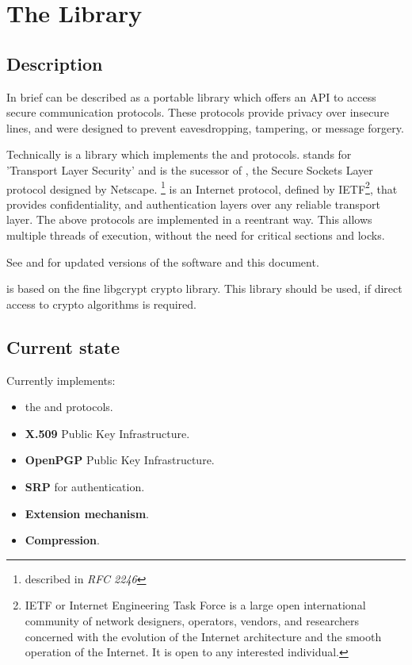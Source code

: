 \chapter{The Library}

\section{Description}
\par
In brief \gnutls{} can be described as a portable library which offers
an API to access secure communication protocols. These protocols provide
privacy over insecure lines, and were designed to prevent 
eavesdropping, tampering, or message forgery.

\par
Technically \gnutls{} is a library which implements the \tlsI{} and 
\sslIII{} protocols. \tls{} stands for 'Transport Layer Security' and is the sucessor of \ssl{}, 
the Secure Sockets Layer protocol designed by Netscape. 
\tlsI{}\footnote{described in {\it RFC 2246}} is an Internet protocol,
defined by {IETF}\footnote{IETF or Internet Engineering Task Force 
is a large open international community of network
designers, operators, vendors, and researchers concerned with the evolution of 
the Internet architecture and the smooth operation of the Internet. It is open to any interested individual.}, 
that provides confidentiality, and authentication layers over any reliable
transport layer.
The above protocols are implemented in a reentrant way. 
This allows multiple threads of execution, without the need for critical 
sections and locks. 

\par
See 
and  
for updated versions of the \gnutls{} software and this document.

\par 
\gnutls{} is based on the fine 
libgcrypt
crypto library. This library should be used, if direct access to crypto
algorithms is required.

\section{Current state}

Currently \gnutls{} implements:
\begin{itemize}
\item the \tlsI{} and \sslIII{} protocols.
\item {\bf X.509} Public Key Infrastructure.
\item {\bf OpenPGP} Public Key Infrastructure.
\item {\bf SRP} for \tls{} authentication.
\item \tls{} {\bf Extension mechanism}.
\item \tls{} {\bf Compression}.
\end{itemize}


